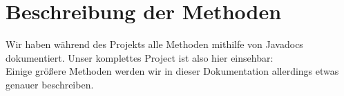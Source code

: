 \section{Beschreibung der Methoden}

Wir haben während des Projekts alle Methoden mithilfe von Javadocs dokumentiert. Unser komplettes Project ist also hier einsehbar: %
\\

Einige größere Methoden werden wir in dieser Dokumentation allerdings etwas genauer beschreiben.